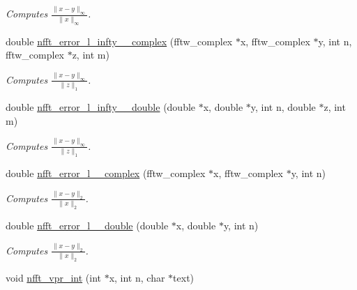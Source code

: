 \begin{CompactItemize}
\begin{CompactList}\small\item\em Computes $\frac{\|x-y\|_{\infty}}{\|x\|_{\infty}} $. \item\end{CompactList}\item 
\hypertarget{group__nfftutil_g1f46e07f46c6236beaf67679579d98ec}{
double \hyperlink{group__nfftutil_g1f46e07f46c6236beaf67679579d98ec}{nfft\_\-error\_\-l\_\-infty\_\_\-complex} (fftw\_\-complex $\ast$x, fftw\_\-complex $\ast$y, int n, fftw\_\-complex $\ast$z, int m)}
\label{group__nfftutil_g1f46e07f46c6236beaf67679579d98ec}

\begin{CompactList}\small\item\em Computes $\frac{\|x-y\|_{\infty}}{\|z\|_1} $. \item\end{CompactList}\item 
\hypertarget{group__nfftutil_g4f6d14f232cb3476578062789966d5cd}{
double \hyperlink{group__nfftutil_g4f6d14f232cb3476578062789966d5cd}{nfft\_\-error\_\-l\_\-infty\_\_\-double} (double $\ast$x, double $\ast$y, int n, double $\ast$z, int m)}
\label{group__nfftutil_g4f6d14f232cb3476578062789966d5cd}

\begin{CompactList}\small\item\em Computes $\frac{\|x-y\|_{\infty}}{\|z\|_1} $. \item\end{CompactList}\item 
\hypertarget{group__nfftutil_gcdfad5420393c822ecc1602d9c164090}{
double \hyperlink{group__nfftutil_gcdfad5420393c822ecc1602d9c164090}{nfft\_\-error\_\-l\_\_\-complex} (fftw\_\-complex $\ast$x, fftw\_\-complex $\ast$y, int n)}
\label{group__nfftutil_gcdfad5420393c822ecc1602d9c164090}

\begin{CompactList}\small\item\em Computes $\frac{\|x-y\|_2}{\|x\|_2} $. \item\end{CompactList}\item 
\hypertarget{group__nfftutil_gfbeb63506d5b5a85a17a282f9c316288}{
double \hyperlink{group__nfftutil_gfbeb63506d5b5a85a17a282f9c316288}{nfft\_\-error\_\-l\_\_\-double} (double $\ast$x, double $\ast$y, int n)}
\label{group__nfftutil_gfbeb63506d5b5a85a17a282f9c316288}

\begin{CompactList}\small\item\em Computes $\frac{\|x-y\|_2}{\|x\|_2} $. \item\end{CompactList}\item 
\hypertarget{group__nfftutil_ga8e0581d802c4b7bb153682a4c156409}{
void \hyperlink{group__nfftutil_ga8e0581d802c4b7bb153682a4c156409}{nfft\_\-vpr\_\-int} (int $\ast$x, int n, char $\ast$text)}
\label{group__nfftutil_ga8e0581d802c4b7bb153682a4c156409}


\end{CompactItemize}
